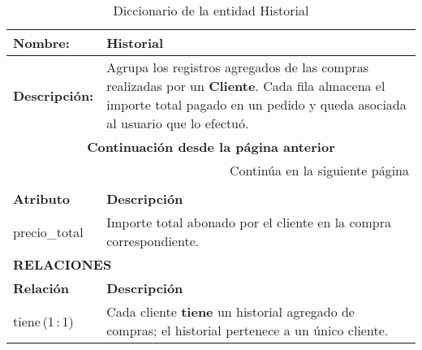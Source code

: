 \renewcommand{\arraystretch}{1.3}
\begin{longtable}{|p{3.5cm}|p{10cm}|}
\caption{Diccionario de la entidad Historial}
\label{tab:diccionarioHistorial} \\ 
\hline
\textbf{Nombre:} & Historial \\
\hline
\textbf{Descripción:} & 
Agrupa los registros agregados de las compras realizadas por un
\textbf{Cliente}.  Cada fila almacena el importe total pagado en un
pedido y queda asociada al usuario que lo efectuó. \\ \hline
\endfirsthead

\multicolumn{2}{c}{\textbf{Continuación desde la página anterior}} \\ 
\endhead

\hline \multicolumn{2}{r}{{Continúa en la siguiente página}} \\ 
\endfoot

\hline
\endlastfoot

\multicolumn{2}{|p{13.5cm}|}{\textbf{ATRIBUTOS}} \\ \hline
\textbf{Atributo} & \textbf{Descripción} \\ \hline
precio\_total & Importe total abonado por el cliente en la compra correspondiente. \\ \hline

\multicolumn{2}{|p{13.5cm}|}{\textbf{RELACIONES}} \\ \hline
\textbf{Relación} & \textbf{Descripción} \\ \hline
tiene\,(1\,:\,1)&  
Cada cliente \textbf{tiene} un historial agregado de compras;  
el historial pertenece a un único cliente. \\ \hline
\end{longtable}
